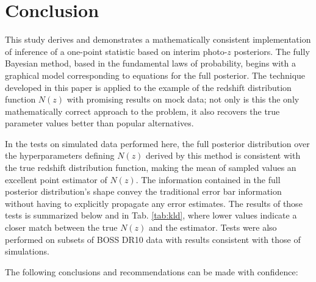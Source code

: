 \documentclass[preprint]{aastex}
\begin{document}
\section{Conclusion}
\label{sec:con}

This study derives and demonstrates a mathematically consistent implementation 
of inference of a one-point statistic based on interim photo-$z$ posteriors.  
The fully Bayesian method, based in the fundamental laws of probability, begins 
with a graphical model corresponding to equations for the full posterior.  The 
technique developed in this paper is applied to the example of the redshift 
distribution function $N(z)$ with promising results on mock data; not only is 
this the only mathematically correct approach to the problem, it also recovers 
the true parameter values better than popular alternatives.  

In the tests on simulated data performed here, the full posterior distribution 
over the hyperparameters defining $N(z)$ derived by this method is consistent 
with the true redshift distribution function, making the mean of sampled values 
an excellent point estimator of $N(z)$.  The information contained in the full 
posterior distribution's shape convey the traditional error bar information 
without having to explicitly propagate any error estimates.  The results of 
those tests is summarized below and in Tab. \ref{tab:kld}, where lower values 
indicate a closer match between the true $N(z)$ and the estimator.  Tests were 
also performed on subsets of BOSS DR10 data with results consistent with those 
of simulations.

The following conclusions and recommendations can be made with confidence:
\end{document}
